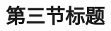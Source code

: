 \documentclass[../../main.tex]{subfiles}
\begin{document}
\section{第三节标题}

\lipsum[1-3]%
\end{document}
